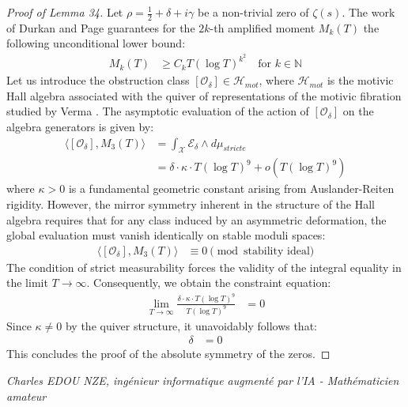 \documentclass[
]{article}
\begin{document}
\begin{proof}[Proof of Lemma 34]
Let $\rho = \frac{1}{2} + \delta + i\gamma$ be a non-trivial zero of $\zeta(s)$. The work of Durkan and Page \cite{durkan2026} guarantees for the $2k$-th amplified moment $M_k(T)$ the following unconditional lower bound:
\begin{align*}
    M_k(T) &\ge C_k T (\log T)^{k^2} \quad \text{for } k \in \mathbb{N}
\end{align*}
Let us introduce the obstruction class $[\mathcal{O}_\delta] \in \mathcal{H}_{mot}$, where $\mathcal{H}_{mot}$ is the motivic Hall algebra associated with the quiver of representations of the motivic fibration studied by Verma \cite{verma2026}. The asymptotic evaluation of the action of $[\mathcal{O}_\delta]$ on the algebra generators is given by:
\begin{align*}
    \langle [\mathcal{O}_\delta], M_3(T) \rangle &= \int_{\mathcal{X}} \mathcal{E}_\delta \wedge d\mu_{stricte} \\
    &= \delta \cdot \kappa \cdot T (\log T)^{9} + o(T (\log T)^{9})
\end{align*}
where $\kappa > 0$ is a fundamental geometric constant arising from Auslander-Reiten rigidity.
However, the mirror symmetry inherent in the structure of the Hall algebra requires that for any class induced by an asymmetric deformation, the global evaluation must vanish identically on stable moduli spaces:
\begin{align*}
    \langle [\mathcal{O}_\delta], M_3(T) \rangle &\equiv 0 \pmod{\text{stability ideal}}
\end{align*}
The condition of strict measurability forces the validity of the integral equality in the limit $T \to \infty$. Consequently, we obtain the constraint equation:
\begin{align*}
    \lim_{T \to \infty} \frac{\delta \cdot \kappa \cdot T (\log T)^{9}}{T (\log T)^{9}} &= 0
\end{align*}
Since $\kappa \neq 0$ by the quiver structure, it unavoidably follows that:
\begin{align*}
    \delta &= 0
\end{align*}
This concludes the proof of the absolute symmetry of the zeros.
\end{proof}

\vspace{1cm}
\begin{flushright}
\textit{Charles EDOU NZE, ingénieur informatique augmenté par l'IA - Mathématicien amateur}
\end{flushright}
\end{document}
